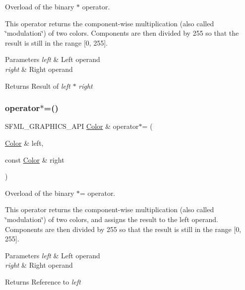 Overload of the binary $\ast$ operator. 

This operator returns the component-\/wise multiplication (also called \char`\"{}modulation\char`\"{}) of two colors. Components are then divided by 255 so that the result is still in the range \mbox{[}0, 255\mbox{]}.


\begin{DoxyParams}{Parameters}
{\em left} & Left operand \\
\hline
{\em right} & Right operand\\
\hline
\end{DoxyParams}
\begin{DoxyReturn}{Returns}
Result of {\itshape left} $\ast$ {\itshape right} \begin{DoxyVerb}\end{DoxyVerb}
 
\end{DoxyReturn}
\mbox{\label{classsf_1_1_color_a8953be58a47ced92fb25966d6ee90511}} 
\subsubsection{\texorpdfstring{operator$\ast$=()}{operator*=()}}
{\footnotesize\ttfamily S\+F\+M\+L\+\_\+\+G\+R\+A\+P\+H\+I\+C\+S\+\_\+\+A\+PI \mbox{\hyperlink{classsf_1_1_color}{Color}} \& operator$\ast$= (\begin{DoxyParamCaption}\item[{\mbox{\hyperlink{classsf_1_1_color}{Color}} \&}]{left,  }\item[{const \mbox{\hyperlink{classsf_1_1_color}{Color}} \&}]{right }\end{DoxyParamCaption})\hspace{0.3cm}{\ttfamily [related]}}



Overload of the binary $\ast$= operator. 

This operator returns the component-\/wise multiplication (also called \char`\"{}modulation\char`\"{}) of two colors, and assigns the result to the left operand. Components are then divided by 255 so that the result is still in the range \mbox{[}0, 255\mbox{]}.


\begin{DoxyParams}{Parameters}
{\em left} & Left operand \\
\hline
{\em right} & Right operand\\
\hline
\end{DoxyParams}
\begin{DoxyReturn}{Returns}
Reference to {\itshape left} \begin{DoxyVerb}\end{DoxyVerb}
 
\end{DoxyReturn}
\mbox{\label{classsf_1_1_color_a90e79ecc276114cda519a88119ac645b}} 
